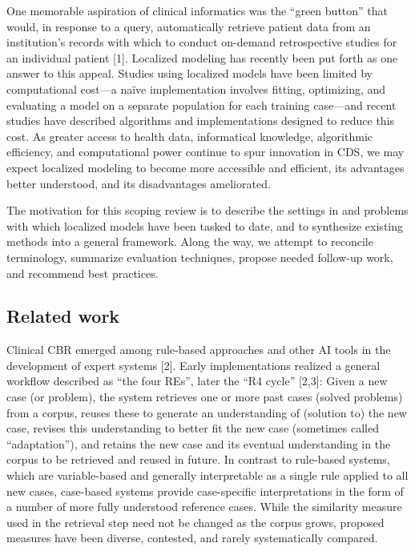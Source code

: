 \documentclass[preprint, 3p,
authoryear]{elsarticle} %
\begin{document}
One memorable aspiration of clinical informatics was the ``green
button'' that would, in response to a query, automatically retrieve
patient data from an institution's records with which to conduct
on-demand retrospective studies for an individual patient {[}1{]}.
Localized modeling has recently been put forth as one answer to this
appeal. Studies using localized models have been limited by
computational cost---a naïve implementation involves fitting,
optimizing, and evaluating a model on a separate population for each
training case---and recent studies have described algorithms and
implementations designed to reduce this cost. As greater access to
health data, informatical knowledge, algorithmic efficiency, and
computational power continue to spur innovation in CDS, we may expect
localized modeling to become more accessible and efficient, its
advantages better understood, and its disadvantages ameliorated.

The motivation for this scoping review is to describe the settings in
and problems with which localized models have been tasked to date, and
to synthesize existing methods into a general framework. Along the way,
we attempt to reconcile terminology, summarize evaluation techniques,
propose needed follow-up work, and recommend best practices.

\hypertarget{related-work}{%
\subsection{Related work}\label{related-work}}

Clinical CBR emerged among rule-based approaches and other AI tools in
the development of expert systems {[}2{]}. Early implementations
realized a general workflow described as ``the four REs'', later the
``R4 cycle'' {[}2,3{]}: Given a new case (or problem), the system
retrieves one or more past cases (solved problems) from a corpus, reuses
these to generate an understanding of (solution to) the new case,
revises this understanding to better fit the new case (sometimes called
``adaptation''), and retains the new case and its eventual understanding
in the corpus to be retrieved and reused in future. In contrast to
rule-based systems, which are variable-based and generally interpretable
as a single rule applied to all new cases, case-based systems provide
case-specific interpretations in the form of a number of more fully
understood reference cases. While the similarity measure used in the
retrieval step need not be changed as the corpus grows, proposed
measures have been diverse, contested, and rarely systematically
compared.
\end{document}
